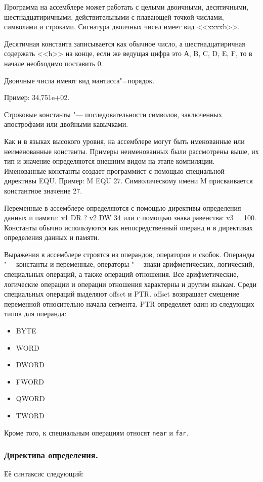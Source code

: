 Программа на ассемблере может работать с целыми двоичными, десятичными, шестнадцатиричными, действительными
с плавающей точкой числами, символами и строками. Сигнатура двоичных чисел имеет вид <<xxxxb>>.

Десятичная константа записывается как обычное число, а шестнадцатиричная содержать <<h>> на конце,
если же ведущая цифра это А, B, C, D, E, F, то в начале необходимо поставить 0.

Двоичные числа имеют вид мантисса"=порядок. 

Пример: 34,751e+02. 

Строковые константы "--- последовательности символов,
заключенных апострофами или двойными кавычками.

Как и в языках высокого уровня, на ассемблере могут быть именованные или неименованные константы.
Примеры неименованных были рассмотрены выше, их тип и значение определяются внешним видом на этапе компиляции.
Именованные константы создает программист с помощью специальной директивы EQU. Пример: M EQU 27.
Символическому имени M присваивается константное значение 27.

Переменные в ассемблере определяются с помощью директивы определения данных и памяти: v1 DR ?
v2 DW 34 или с помощью знака равенства: v3 = 100. 
Константы обычно используются как непосредственный операнд и в директивах определения данных и памяти.

Выражения в ассемблере строятся из операндов, операторов и скобок. Операнды "--- константы и переменные,
операторы "--- знаки арифметических, логический, специальных операций, а также операций отношения.
Все арифметические, логические операции и операции отношения характерны и другим языкам. Среди специальных
операций выделяют offset и PTR. offset возвращает смещение переменной относительно начала сегмента.
PTR определяет один из следующих типов для операнда:
\begin{itemize}
    \item BYTE
    \item WORD
    \item DWORD
    \item FWORD
    \item QWORD
    \item TWORD  
\end{itemize}
Кроме того, к специальным операциям относят \verb|near| и \verb|far|.

\subsubsection{Директива определения.} 
Её синтаксис следующий:

